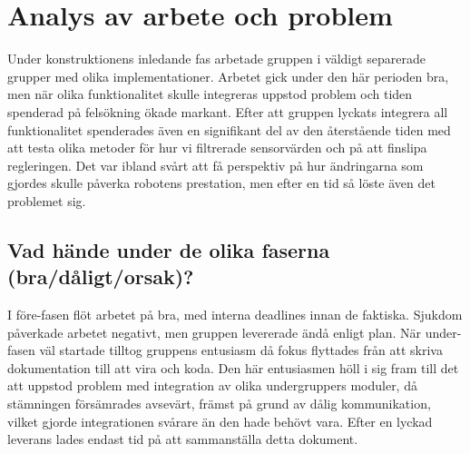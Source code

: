 \documentclass{article}
\begin{document}
\clearpage
\section{Analys av arbete och problem}
Under konstruktionens inledande fas arbetade gruppen i väldigt separerade grupper med olika implementationer. Arbetet gick under den här perioden bra, men när olika funktionalitet skulle integreras uppstod problem och tiden spenderad på felsökning ökade markant. Efter att gruppen lyckats integrera all funktionalitet spenderades även en signifikant del av den återstående tiden med att testa olika metoder för hur vi filtrerade sensorvärden och på att finslipa regleringen. Det var ibland svårt att få perspektiv på hur ändringarna som gjordes skulle påverka robotens prestation, men efter en tid så löste även det problemet sig.

\subsection{Vad hände under de olika faserna (bra/dåligt/orsak)?}
I före-fasen flöt arbetet på bra, med interna deadlines innan de faktiska. Sjukdom påverkade arbetet negativt, men gruppen levererade ändå enligt plan. När under-fasen väl startade tilltog gruppens entusiasm då fokus flyttades från att skriva dokumentation till att vira och koda. Den här entusiasmen höll i sig fram till det att uppstod problem med integration av olika undergruppers moduler, då stämningen försämrades avsevärt, främst på grund av dålig kommunikation, vilket gjorde integrationen svårare än den hade behövt vara. Efter en lyckad leverans lades endast tid på att sammanställa detta dokument.
\end{document}
